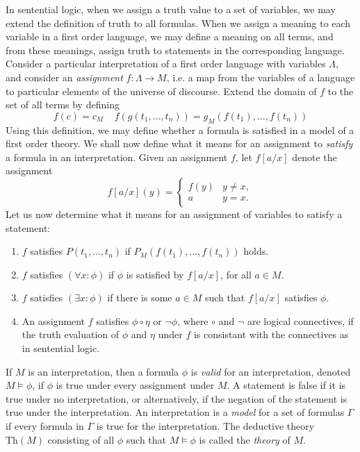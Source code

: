 In sentential logic, when we assign a truth value to a set of variables, we may extend the definition of truth to all formulas. When we assign a meaning to each variable in a first order language, we may define a meaning on all terms, and from these meanings, assign truth to statements in the corresponding language. Consider a particular interpretation of a first order language with variables $\Lambda$, and consider an \emph{assignment} $f: \Lambda \to M$, i.e. a map from the variables of a language to particular elements of the universe of discourse. Extend the domain of $f$ to the set of all terms by defining
%
\[ f(c) = c_M\ \ \ \ \ f(g(t_1, \dots, t_n)) = g_M(f(t_1), \dots, f(t_n)) \]
%
Using this definition, we may define whether a formula is satisfied in a model of a first order theory. We shall now define what it means for an assignment to \emph{satisfy} a formula in an interpretation. Given an assignment $f$, let $f[a/x]$ denote the assignment
%
\[ f[a/x](y) = \begin{cases} f(y) & y \neq x, \\ a & y = x. \end{cases} \]
%
Let us now determine what it means for an assignment of variables to satisfy a statement:
%
\begin{enumerate}
    \item $f$ satisfies $P(t_1, \dots, t_n)$ if $P_M(f(t_1), \dots, f(t_n))$ holds.
    \item $f$ satisfies $(\forall x: \phi)$ if $\phi$ is satisfied by $f[a/x]$, for all $a \in M$.
    \item $f$ satisfies $(\exists x: \phi)$ if there is some $a \in M$ such that $f[a/x]$ satisfies $\phi$.
    \item An assignment $f$ satisfies $\phi \circ \eta$ or $\neg \phi$, where $\circ$ and $\neg$ are logical connectives, if the truth evaluation of $\phi$ and $\eta$ under $f$ is consistant with the connectives as in sentential logic.
\end{enumerate}
%
If $M$ is an interpretation, then a formula $\phi$ is \emph{valid} for an interpretation, denoted $M \vDash \phi$, if $\phi$ is true under every assignment under $M$. A statement is false if it is true under no interpretation, or alternatively, if the negation of the statement is true under the interpretation. An interpretation is a \emph{model} for a set of formulas $\Gamma$ if every formula in $\Gamma$ is true for the interpretation. The deductive theory $\text{Th}(M)$ consisting of all $\phi$ such that $M \vDash \phi$ is called the \emph{theory} of $M$.

